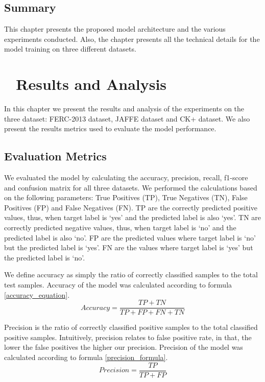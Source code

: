 \documentclass[master]{thesis-uestc}
\begin{document}
\section{Summary}
This chapter presents the proposed model architecture and the various experiments conducted. Also, the chapter presents all the technical details for the model training on three different datasets.




\chapter{\,\,\,\,\,\textbf{Results and Analysis}}\label{chp4}
In this chapter we present the results and analysis of the experiments on the three dataset: FERC-2013 dataset, JAFFE dataset and CK+ dataset. We also present the results metrics used to evaluate the model performance.
\section{Evaluation Metrics}
We evaluated the model by calculating the accuracy, precision, recall, f1-score and confusion matrix\cite{FAWCETT2006861} for all three datasets. We performed the calculations based on the following parameters: True Positives (TP), True Negatives (TN), False Positives (FP) and False Negatives (FN). TP are the correctly predicted positive values, thus, when target label is `yes' and the predicted label is also `yes'. TN are correctly predicted negative values, thus, when target label is `no' and the predicted label is also `no'. FP are the predicted values where target label is `no' but the predicted label is `yes'. FN are the values where target label is `yes' but the predicted label is `no'.

We define accuracy as simply the ratio of correctly classified samples to the total test samples. Accuracy of the model was calculated according to formula \ref{accuracy_equation}.
\begin{equation}
Accuracy=\frac{TP + TN}
 {TP + FP + FN + TN}
 \label{accuracy_equation}
\end{equation}

Precision is the ratio of correctly classified positive samples to the total classified positive samples. Intuitively, precision relates to false positive rate, in that, the lower the false positives the higher our precision. Precision of the model was calculated according to formula \ref{precision_formula}.
\begin{equation}
Precision=\frac{TP}
 {TP + FP}
 \label{precision_formula}
\end{equation}
\end{document}
